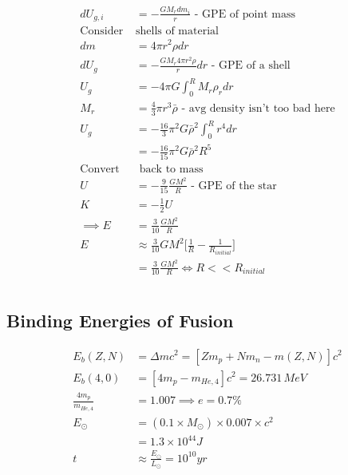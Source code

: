 \documentclass[a4paper,11pt,normalem]{article}
\begin{document}
\begin{align*}
    dU_{g,i} &= -\frac{GM_{r}dm_{i}}{r} \text{ - GPE of point mass} \\
    \text{Consider }& \text{shells of material} \\
    dm &= 4\pi r^2 \rho dr \\
    dU_{g} &= -\frac{GM_r 4\pi r^2 \rho}{r}dr \text{ - GPE of a shell} \\
    U_g &= -4\pi G \int_{0}^{R} M_r \rho_r dr \\
    M_r &= \frac{4}{3}\pi r^3 \bar{\rho} \text{ - avg density isn't too bad here} \\
    U_g &= -\frac{16}{3}\pi^2 G\bar{\rho}^2 \int_{0}^{R} r^4 dr \\
    &= -\frac{16}{15}\pi^2 G\bar{\rho}^2 R^5 \\
    \text{Convert} &\text{ back to mass} \\
    U &= -\frac{9}{15}\frac{GM^2}{R} \text{ - GPE of the star} \\
    K &= -\frac{1}{2} U \\
    \implies E &= \frac{3}{10}\frac{GM^2}{R} \\
    E &\approx \frac{3}{10} GM^2 \Big[\frac{1}{R} - \frac{1}{R_{initial}}\Big] \\
    &= \frac{3}{10}\frac{GM^2}{R} \iff R << R_{initial}
\end{align*}

\section{}
\subsection{Binding Energies of Fusion}

\begin{align*}
    E_b(Z,N) &= \Delta mc^2 = [Zm_p + Nm_n - m(Z, N)]c^2 \\
    E_b(4,0) &= [4m_p - m_{He,4}]c^2 = 26.731\,MeV \\
    \frac{4m_p}{m_{He,4}} &= 1.007 \implies  e = 0.7\% \\
    E_{\odot} &= (0.1\times M_\odot)\times0.007\times c^2  \\
    &= 1.3\times10^{44}J \\
    t &\approx \frac{E_\odot}{L_\odot} = 10^{10}yr
\end{align*}
\end{document}
